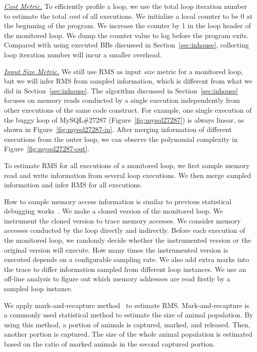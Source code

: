 {\underline{\textit{Cost Metric.}}
To efficiently profile a loop, we use the total loop iteration number 
to estimate the total \textit{cost} of all executions.
We initialize a local counter to be 0 at the beginning of the program.
We increase the counter by 1 in the loop header of the monitored loop.
We dump the counter value to log before the program exits. 
Compared with using executed BBs discussed in Section~\ref{sec:inhouse}, 
collecting loop iteration number will incur a smaller overhead.   


{\underline{\textit{Input Size Metric.}}
We still use RMS as input \textit{size} metric for a monitored loop, 
but we will infer RMS from sampled information, 
which is different from what we did in Section~\ref{sec:inhouse}.
The algorithm discussed in Section~\ref{sec:inhouse} 
focuses on memory reads conducted by a single execution 
independently from other executions 
of the same code construct. 
For example, one single execution of 
the buggy loop of MySQL\#27287 (Figure~\ref{fig:mysql27287})
is always linear, as shown in Figure~\ref{fig:mysql27287-in}.
After merging information of different executions from the outer loop,
we can observe the polynomial complexity 
in Figure~\ref{fig:mysql27287-out}.

To estimate RMS for all executions of a monitored loop, 
we first sample memory read and write information 
from several loop executions. 
We then merge sampled information and 
infer RMS for all executions. 

How to sample memory access information is similar to previous 
statistical debugging works~\cite{liblit03,liblit05,CCI,SongOOPSLA2014,ldoctor}.
We make a cloned version of the monitored loop.
We instrument the cloned version to trace memory accesses.
We consider memory accesses conducted by the loop directly
and indirectly. 
Before each execution of the monitored loop, 
we randomly decide whether the instrumented version 
or the original version will execute. 
How many times the instrumented version is executed 
depends on a configurable sampling rate. 
We also add extra marks into the trace to 
differ information sampled from different loop instances. 
We use an off-line analysis to figure out which 
memory addresses are read firstly by a sampled loop instance. 


We apply mark-and-recapture method~\citep{mark-recapture} to estimate RMS. 
Mark-and-recapture is a commonly used statistical method 
to estimate the size of animal population. 
By using this method, a portion of animals is captured, marked, and released. 
Then, another portion is captured.
The size of the whole animal population is estimated 
based on the ratio of marked animals in the second captured portion.  

}}

